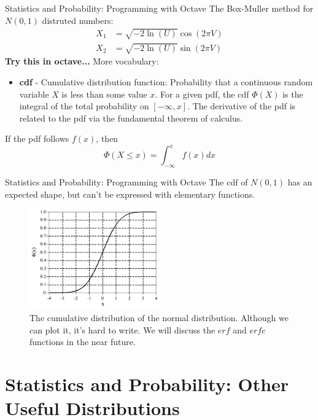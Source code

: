\documentclass{beamer}
\begin{document}
\begin{frame}[fragile]{Statistics and Probability: Programming with Octave}
\small
The Box-Muller method for $N(0,1)$ distruted numbers:
\begin{align}
X_1 &= \sqrt{-2\ln(U)}\cos(2\pi V) \\
X_2 &= \sqrt{-2\ln(U)}\sin(2\pi V)
\end{align}
\textbf{Try this in octave...}
More vocabulary:
\begin{itemize}
\item \textbf{cdf} - Cumulative distribution function: Probability that a continuous random variable $X$ is less than some value $x$.  For a given pdf, the cdf $\Phi(X)$ is the integral of the total probability on $[-\infty,x]$.  The derivative of the pdf is related to the pdf via the fundamental theorem of calculus.
\end{itemize}
If the pdf follows $f(x)$, then 
\begin{equation}
\Phi(X\leq x) = \int_{-\infty}^{x} f(x) dx
\end{equation}
\end{frame}

\begin{frame}[fragile]{Statistics and Probability: Programming with Octave}
The cdf of $N(0,1)$ has an expected shape, but can't be expressed with elementary functions.
\begin{figure}
\centering
\includegraphics[width=0.5\textwidth]{figures/cdfgaus.png}
\caption{\label{fig:cdfgaus} The cumulative distribution of the normal distribution.  Although we can plot it, it's hard to write.  We will discuss the $erf$ and $erfc$ functions in the near future.}
\end{figure}
\end{frame}

\section{Statistics and Probability: Other Useful Distributions}
\end{document}
